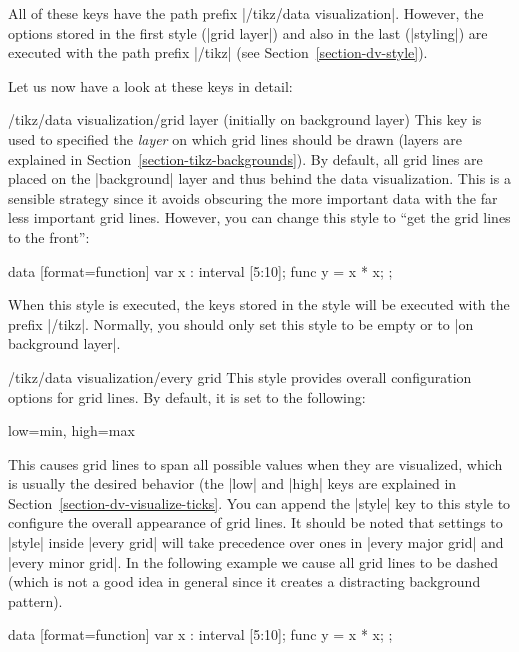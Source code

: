 All of these keys have the path prefix |/tikz/data visualization|. However, the
options stored in the first style (|grid layer|) and also in the last
(|styling|) are executed with the path prefix |/tikz| (see
Section~\ref{section-dv-style}).

Let us now have a look at these keys in detail:

\begin{stylekey}{/tikz/data visualization/grid layer (initially on background layer)}
\label{section-dv-grid-layer}%
    This key is used to specified the \emph{layer} on which grid lines should
    be drawn (layers are explained in Section~\ref{section-tikz-backgrounds}).
    By default, all grid lines are placed on the |background| layer and thus
    behind the data visualization. This is a sensible strategy since it avoids
    obscuring the more important data with the far less important grid lines.
    However, you can change this style to ``get the grid lines to the front'':
\begin{codeexample}[preamble={\usetikzlibrary{datavisualization.formats.functions}}]
\tikz \datavisualization
  [scientific axes,
   all axes={
     length=3cm,
     grid,
     grid={minor steps between steps}
   },
   grid layer/.style=, %
   visualize as line]
  data [format=function] {
    var x : interval [5:10];
    func y = \value x * \value x;
  };
\end{codeexample}
    When this style is executed, the keys stored in the style will be executed
    with the prefix |/tikz|. Normally, you should only set this style to be
    empty or to |on background layer|.
\end{stylekey}

\begin{stylekey}{/tikz/data visualization/every grid}
    This style provides overall configuration options for grid lines. By
    default, it is set to the following:
\begin{codeexample}
low=min, high=max
\end{codeexample}
    This causes grid lines to span all possible values when they are
    visualized, which is usually the desired behavior (the |low| and |high|
    keys are explained in Section~\ref{section-dv-visualize-ticks}. You can
    append the |style| key to this style to configure the overall appearance of
    grid lines. It should be noted that settings to |style| inside |every grid|
    will take precedence over ones in |every major grid| and |every minor grid|.
    In the following example we cause all grid lines to be dashed (which is not
    a good idea in general since it creates a distracting background pattern).
\begin{codeexample}[preamble={\usetikzlibrary{datavisualization.formats.functions}}]
\tikz \datavisualization
  [scientific axes,
   all axes={length=3cm, grid},
   every grid/.append style={style=densely dashed},
   visualize as line]
  data [format=function] {
    var x : interval [5:10];
    func y = \value x * \value x;
  };
\end{codeexample}
\end{stylekey}

